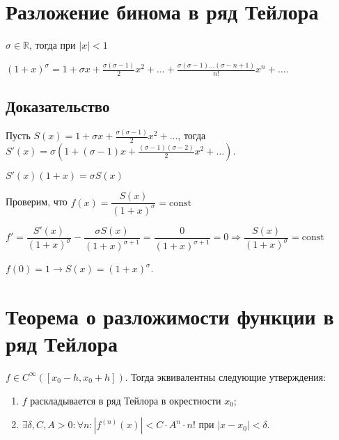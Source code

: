 \documentclass{article}
\begin{document}
    \section{Разложение бинома в ряд Тейлора}
    
        $\sigma \in \mathbb{R}$, тогда при $|x| < 1$
        
        $(1 + x)^{\sigma} = 1 + \sigma x + \frac{\sigma (\sigma - 1)}{2}x^2 + \ldots + \frac{\sigma (\sigma - 1) \ldots (\sigma - n + 1)}{n!} x^n + \ldots$.
        
        \subsection{Доказательство}
        
            Пусть $S(x) = 1 + \sigma x + \frac{\sigma (\sigma - 1)}{2} x^ 2 + \ldots$, тогда $S'(x) = \sigma \left( 1 + (\sigma - 1) x + \frac{(\sigma -1 ) (\sigma - 2)}{2} x^2 + \ldots \right)$.
            
            $S'(x)(1 + x) = \sigma S(x)$
            
            Проверим, что $f(x) = \dfrac{S(x)}{(1 + x)^{\sigma}} = \mathrm{const}$
            
            $f' = \dfrac{S'(x)}{(1 + x)^{\sigma}} - \dfrac{\sigma S(x)}{(1 + x)^{\sigma + 1}} = \dfrac{0}{(1 + x)^{\sigma + 1}} = 0 \Rightarrow \dfrac{S(x)}{(1 + x)^{\sigma}} = \mathrm{const}$
            
            $f(0) = 1 \rightarrow S(x) = (1 + x)^{\sigma}$.
            
    \newpage
    
    \section{Теорема о разложимости функции в ряд Тейлора}
    
        $f \in C^{\infty} \left( [x_0 - h, x_0 + h] \right)$. Тогда эквивалентны следующие утверждения:
        
        \begin{enumerate}
        
            \item $f$ раскладывается в ряд Тейлора в окрестности $x_0$;
            
            \item $\exists \delta, C, A > 0 : \forall n : \left| f^{(n)}(x) \right| < C \cdot A^n \cdot n!$ при $|x - x_0| < \delta$.
            
        \end{enumerate}
        
\end{document}
